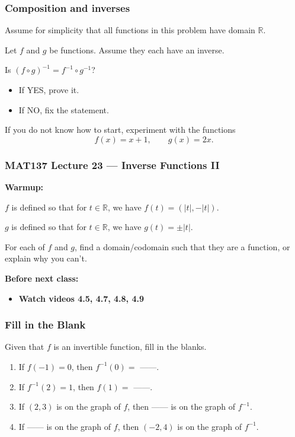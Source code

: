 \documentclass[14pt]{beamer}
\newcommand {\DS} [1] {${\displaystyle #1}$}
\newcommand {\R}{\mathbb{R}}
\newcommand{\p}{\pause}
\begin{document}
\begin{frame}[t]
\frametitle{Composition and inverses}

Assume for simplicity that all functions in this problem have domain $\R$.

\vfill

Let $f$ and $g$ be functions.  Assume they each have an inverse.

\vfill

Is \DS{\left( f \circ g \right)^{-1} = f^{-1} \circ g^{-1}}?

\begin{itemize}
	\item If YES, prove it. 
	\item If NO, fix the statement.
\end{itemize}


\vfill  \p

If you do not know how to start, experiment with the functions
	$$
		f(x) = x + 1, \quad \quad g(x) = 2x.
	$$

\end{frame}
















\begin{frame}
	\frametitle{MAT137 Lecture 23 --- Inverse Functions II}

	{\bf Warmup:}

	$f$ is defined so that for $t\in\mathbb R$, we have $f(t)=(|t|,-|t|)$.

	$g$ is defined so that for $t\in\mathbb R$, we have $g(t)=\pm |t|$.

	\medskip

	For each of $f$ and $g$, find a domain/codomain such that they are a function,
	or explain why you can't.

	\vfill
	{\bf Before next class:}
		\begin{itemize} \normalsize
			\item {\bf Watch videos 4.5, 4.7, 4.8, 4.9 }
		\end{itemize}
\end{frame}


\begin{frame}
\frametitle{Fill in the Blank }

Given that $f$ is an invertible function, fill in the blanks. 
\begin{enumerate}
\item If $f(-1) = 0$, then $f^{-1}(0) =$ ------.
\item If $f^{-1}(2) = 1$, then $f(1)=$ ------.
\item If $(2,3)$ is on the graph of $f$, then ------  is on the graph of $f^{-1}$.
\item If ------ is on the graph of $f$, then $(-2,4)$ is on the graph of $f^{-1}$.
\end{enumerate}


\end{frame}
\end{document}
